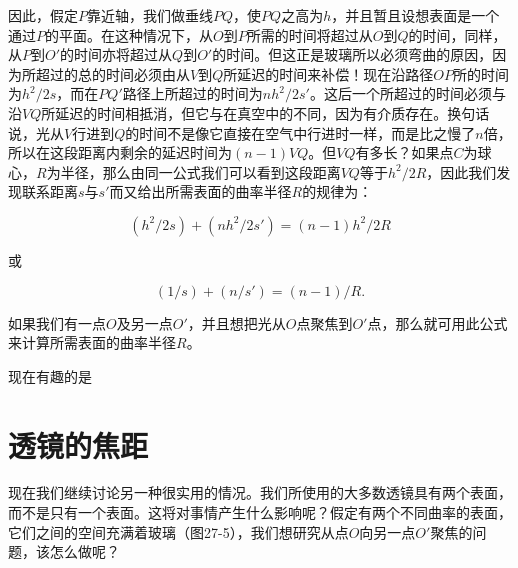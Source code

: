 \documentclass[11pt,oneside]{book}
\begin{document}
\begin{common-format}
因此，假定$ P $靠近轴，我们做垂线$ PQ $，使$ PQ $之高为$ h $，并且暂且设想表面是一个通过$ P $的平面。在这种情况下，从$ O $到$ P $所需的时间将超过从$ O $到$ Q $的时间，同样，从$ P $到$ O' $的时间亦将超过从$ Q $到$ O' $的时间。但这正是玻璃所以必须弯曲的原因，因为所超过的总的时间必须由从$ V $到$ Q $所延迟的时间来补偿！现在沿路径$ OP $所的时间为$ h^2/2s $，而在$ PQ' $路径上所超过的时间为$ nh^2/2s' $。这后一个所超过的时间必须与沿$ VQ $所延迟的时间相抵消，但它与在真空中的不同，因为有介质存在。换句话说，光从$ V $行进到$ Q $的时间不是像它直接在空气中行进时一样，而是比之慢了$ n $倍，所以在这段距离内剩余的延迟时间为$ (n - 1)VQ $。但$ VQ $有多长？如果点$ C $为球心，$ R $为半径，那么由同一公式我们可以看到这段距离$ VQ $等于$ h^2/2R $，因此我们发现联系距离$ s $与$ s' $而又给出所需表面的曲率半径$ R $的规律为：

\begin{equation}
\label{Eq:I:27:2}
(h^2/2s) + (nh^2/2s') = (n-1)h^2/2R
\end{equation}

或

\begin{equation}
\label{Eq:I:27:3}
(1/s)+(n/s')=(n-1)/R.
\end{equation}

如果我们有一点$ O $及另一点$ O' $，并且想把光从$ O $点聚焦到$ O' $点，那么就可用此公式来计算所需表面的曲率半径$ R $。

现在有趣的是


\section{透镜的焦距}
现在我们继续讨论另一种很实用的情况。我们所使用的大多数透镜具有两个表面，而不是只有一个表面。这将对事情产生什么影响呢？假定有两个不同曲率的表面，它们之间的空间充满着玻璃（图27-5），我们想研究从点$ O $向另一点$ O' $聚焦的问题，该怎么做呢？


\end{common-format}
\end{document}
